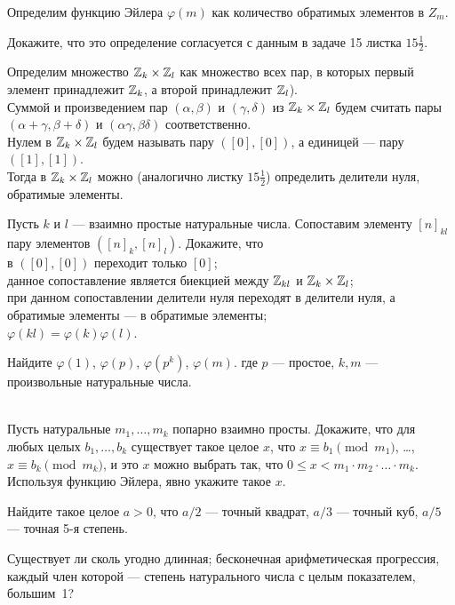 \documentclass[a4paper, 12pt]{article}
\begin{document}
Определим функцию Эйлера $\varphi(m)$ как количество обратимых элементов в $Z_m$.

Докажите, что это определение согласуется с данным в задаче 15 листка $15\frac12$.

Определим множество $\mathbb{Z}_k\times\mathbb{Z}_l$ как множество всех пар, в которых первый элемент принадлежит $\mathbb{Z}_k$, а второй принадлежит $\mathbb{Z}_l$).\\
Суммой и произведением пар $(\alpha,\beta)$ и $(\gamma,\delta)$ из $\mathbb{Z}_k\times\mathbb{Z}_l$ будем считать пары $(\alpha+\gamma, \beta+\delta)$ и $(\alpha\gamma,\beta\delta)$ соответственно.\\ Нулем в $\mathbb{Z}_k\times\mathbb{Z}_l$ будем называть пару $([0],[0])$, а единицей --- пару $([1],[1])$.\\ Тогда в $\mathbb{Z}_k\times\mathbb{Z}_l$ можно (аналогично листку $15\frac12$) определить делители нуля, обратимые элементы.
 

 Пусть $k$ и $l$ --- взаимно простые натуральные числа. Сопоставим элементу $[n]_{kl}$ пару элементов $([n]_k,[n]_l)$. Докажите, что
\\
 в $([0],[0])$ переходит только $[0]$;\\
 данное сопоставление является биекцией между $\mathbb{Z}_{kl}$ и $\mathbb{Z}_k\times\mathbb{Z}_l$;\\
 при данном сопоставлении делители нуля переходят в делители нуля, а обратимые элементы --- в обратимые элементы;\\
 $\varphi(kl) = \varphi(k)\varphi(l)$.

 Найдите  $\varphi(1)$,  $\varphi(p)$,  $\varphi(p^k)$,  $\varphi(m)$. где $p$ --- простое, $k,m$ --- произвольные натуральные числа.

\\
 Пусть натуральные $m_1, \dots, m_k$ попарно взаимно просты.
Докажите, что для любых целых $b_1,\dots,b_k$ существует такое
целое $x$, что
$x\equiv b_1\!\pmod{m_1}$, \dots,
$x\equiv b_k\!\pmod{m_k}$,
и это $x$ можно выбрать так, что
$0\leq x< m_1\cdot m_2\cdot\ldots\cdot m_k$.\\
 Используя функцию Эйлера, явно укажите такое $x$.

Найдите такое целое $a>0$, что $a/2$ --- точный квадрат, $a/3$ --- точный куб, $a/5$ --- точная 5-я степень.


Существует ли
сколь угодно длинная;
бесконечная арифметическая прогрессия, каждый член которой --- степень
натурального числа с целым показателем, большим~1?



\end{document}
